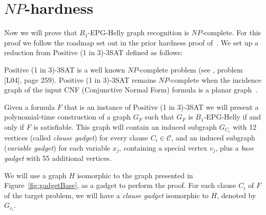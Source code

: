 \documentclass[runningheads]{llncs}
\begin{document}
\section{$NP$-hardness}\label{sec:sectionDispositivoClausula}

Now we will prove that  $B_1$-EPG-Helly graph recognition is $NP$-complete. For this proof we follow the roadmap set out in the prior hardness proof of~\cite{heldt2014}. We set up a reduction from {\sc Positive (1 in 3)-3SAT} defined  as follows:






{\sc Positive (1 in 3)-3SAT } is a well known $NP$-complete problem (see \cite{johnson1979}, problem [L04], page 259). {\sc Positive (1 in 3)-3SAT} remains $NP$-complete when the incidence graph of the input CNF (Conjunctive Normal Form) formula is a planar graph~\cite{mulzer2008minimum}.

Given a formula $F$ that is an instance of {\sc Positive (1 in 3)-3SAT} we will present a polynomial-time construction of a graph $ G_F$ such that $ G_F $ is $ B_1$-EPG-Helly if and only if $ F $ is satisfiable. This graph will contain an induced subgraph $ G_{C_i}$ with 12 vertices (called \emph {clause gadget}) for every clause $C_i \in \mathcal{C}$, and an induced subgraph (\emph {variable gadget}) for each variable $ x_j$, containing a special vertex  $ v_j$, plus a \emph{base gadget}  with 55 additional vertices.

We will use a graph $H$ isomorphic to the graph presented in Figure~\ref{fig:gadgetBase}, as a gadget to perform the proof. For each clause $C_i$ of $F$ of the target problem, we will have a \emph{clause gadget} isomorphic to $H$, denoted by $G_{c_i}$. %
\vspace{-0.5cm}
 \vspace{-0.5cm}

\end{document}
